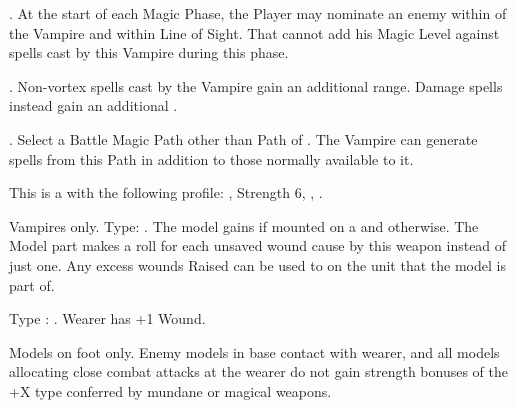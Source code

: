 \startpricelist

 \textbf{\ancientbloodpower}. At the start of each Magic Phase, the Player may nominate an enemy \wizard{} within  of the Vampire and within Line of Sight. That \wizard{} cannot add his Magic Level  against spells cast by this Vampire during this phase.

 \textbf{\bloodlinepower}. Non-vortex spells cast by the Vampire gain an additional  range. Damage spells instead gain an additional .

 \textbf{\bloodlinepower}. Select a Battle Magic Path other than Path of \nature{}. The Vampire can generate spells from this Path in addition to those normally available to it.

\endpricelist


\closearmynewsection

\startarmymagicalitems

\armymagicalweapons

\startpricelist

 This is a \boltthrower{} \artilleryweapon{} with the following profile: , Strength 6, , .

 Vampires only. Type: \hw{}. The model gains  if mounted on a \largetarget{} and  otherwise. The Model part makes a \vampiric{} roll for each unsaved wound cause by this weapon instead of just one. Any excess wounds Raised can be used to \raisewounds{} on the unit that the model is part of.

\endpricelist

\armymagicalarmour

\startpricelist

 Type : \platearmour{}. Wearer has +1 Wound.

\endpricelist

\armytalismans

\startpricelist

 Models on foot only. Enemy models in base contact with wearer, and all models allocating close combat attacks at the wearer do not gain strength bonuses of the +X type conferred by mundane or magical weapons.

\endpricelist

